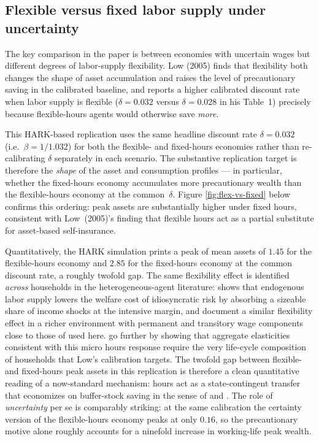 \documentclass[titlepage, headings=optiontotocandhead]{econark} %
\begin{document}
\subsection{Flexible versus fixed labor supply under uncertainty}\label{sec:flex-vs-fixed}
The key comparison in the paper is between economies with uncertain wages but different
degrees of labor-supply flexibility. Low (2005) finds that flexibility both changes the shape
of asset accumulation and raises the level of precautionary saving in the calibrated baseline,
and reports a higher calibrated discount rate when labor supply is flexible
($\delta = 0.032$ versus $\delta = 0.028$ in his Table~1) precisely because flexible-hours
agents would otherwise save \emph{more}.

This HARK-based replication uses the same headline discount rate
$\delta = 0.032$ (i.e.\ $\beta = 1/1.032$) for both the flexible- and
fixed-hours economies rather than re-calibrating $\delta$ separately in
each scenario. The substantive replication target is therefore the
\emph{shape} of the asset and consumption profiles --- in particular,
whether the fixed-hours economy accumulates more precautionary wealth
than the flexible-hours economy at the common~$\delta$. Figure
\ref{fig:flex-vs-fixed} below confirms this ordering: peak assets are
substantially higher under fixed hours, consistent with Low~(2005)'s
finding that flexible hours act as a partial substitute for asset-based
self-insurance.

Quantitatively, the HARK simulation prints a peak of mean assets of
$1.45$ for the flexible-hours economy and $2.85$ for the fixed-hours
economy at the common discount rate, a roughly twofold gap. The same
flexibility effect is identified \emph{across} households in the
heterogeneous-agent literature: \citet{PijoanMas2006Low} shows that
endogenous labor supply lowers the welfare cost of idiosyncratic risk by
absorbing a sizeable share of income shocks at the intensive margin, and
\citet{HeathcoteStoreslettenViolante2010Low} document a similar
flexibility effect in a richer environment with permanent and
transitory wage components close to those of \citet{MeghirPistaferri2004Low}
used here. \citet{ErosaFusterKambourov2016Low} go further by showing
that aggregate elasticities consistent with this micro hours response
require the very life-cycle composition of households that Low's
calibration targets. The twofold gap between flexible- and fixed-hours
peak assets in this replication is therefore a clean quantitative
reading of a now-standard mechanism: hours act as a state-contingent
transfer that economizes on buffer-stock saving in the sense of
\citet{Carroll1997Low} and \citet{CarrollSamwick1997Low}. The role of
\emph{uncertainty} per se is comparably striking: at the same calibration
the certainty version of the flexible-hours economy peaks at only
$0.16$, so the precautionary motive alone roughly accounts for a
ninefold increase in working-life peak wealth.
\end{document}
